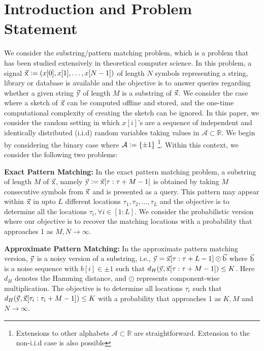 \section{Introduction and Problem Statement}
\label{sec:introduction}
We consider the substring/pattern matching problem, which is a problem that has been studied extensively in theoretical computer science. In this problem, a signal $\vec{\mathrm{x}} \mathrel{\mathop:}= (x[0], x[1],\ldots, x[N-1])$ of length $N$ symbols representing a string, library or database is available and the objective is to answer queries regarding whether a given string $\vec{\mathrm{y}}$ of length $M$ is a substring of $\vec{\mathrm{x}}$. We consider the case where a sketch of $\vec{\mathrm{x}}$ can be computed offline and stored, and the one-time computational complexity of creating the sketch can be ignored. In this paper, we consider the random setting in which $x[i]$'s are a sequence of independent and identically distributed (i.i.d) random variables taking values in $\mathcal{A} \subset \mathbb{R}$. We begin by considering the binary case where $\mathcal{A} \mathrel{\mathop:}= \{\pm 1\}$ \footnote{Extensions to other alphabets $\mathcal{A} \subset \mathbb{R}$ are straightforward. Extension to the non-i.i.d case is also possible}. Within this context, we consider the following two problems:

{\bf Exact Pattern Matching:} In the exact pattern matching problem, a substring of length $M$ of $\vec{\mathrm{x}}$, namely $\vec{\mathrm{y}} \mathrel{\mathop:}= \vec{\mathrm{x}}[\tau:\tau+M-1]$ is obtained by taking $M$ consecutive symbols from $\vec{\mathrm{x}}$ and is presented as a query. This pattern may appear within $\vec{\mathrm{x}}$ in upto $L$ different locations $\tau_1,\tau_2,\ldots,\tau_L$ and the objective is to determine all the locations $\tau_i, \forall i\in[1:L]$. We consider the probabilistic version where our objective is to recover the matching locations with a probability that approaches 1 as $M,N \rightarrow \infty$.

{\bf Approximate Pattern Matching:} In the approximate pattern matching version, $\vec{\mathrm{y}}$ is a noisy version of a substring, i.e., $\vec{\mathrm{y}} = \vec{\mathrm{x}}[\tau:\tau+L-1] \odot \vec{\mathrm{b}}$ where $\vec{\mathrm{b}}$ is a noise sequence with $b[i] \in \pm 1$ such that $d_H(\vec{\mathrm{y}},\vec{\mathrm{x}}[\tau:\tau+M-1]) \leq K$. Here $d_H$ denotes the Hamming distance, and $\odot$ represents component-wise multiplication. The objective is to determine all locations $\tau_i$ such that $d_H(\vec{\mathrm{y}},\vec{\mathrm{x}}[\tau_i:\tau_i+M-1]) \leq K$ with a probability that approaches 1 as $K, M$ and $N \rightarrow \infty$.

